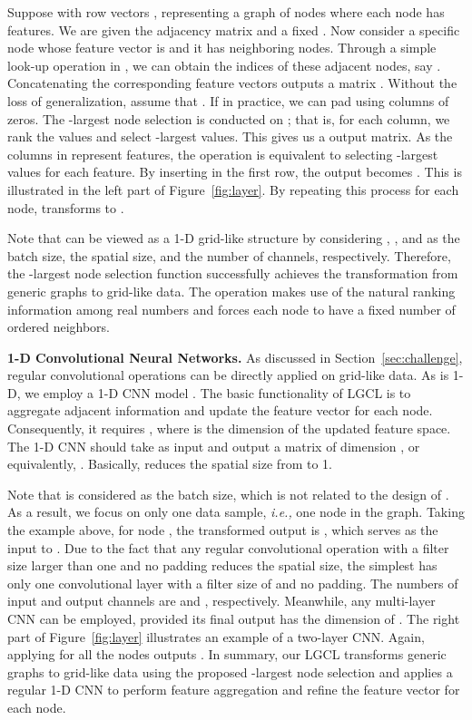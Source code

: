 \documentclass[sigconf]{acmart}
\begin{document}
Suppose  with row vectors , representing a graph of  nodes where each
node has  features. We are given the adjacency matrix  and a fixed . Now consider a specific
node  whose feature vector is  and it has  neighboring
nodes. Through a simple look-up operation in , we can obtain the
indices of these adjacent nodes, say .
Concatenating the corresponding feature vectors  outputs a matrix . Without the loss of generalization, assume
that . If  in practice, we can pad  using
columns of zeros. The -largest node selection is conducted on
; that is, for each column, we rank the  values and select
-largest values. This gives us a  output matrix. As
the columns in  represent features, the operation is
equivalent to selecting -largest values for each feature. By
inserting  in the first row, the output becomes . This is illustrated in the left
part of Figure~\ref{fig:layer}. By repeating this process for each
node,  transforms  to .


Note that  can be viewed as a 1-D grid-like structure by
considering , , and  as the batch size, the spatial
size, and the number of channels, respectively. Therefore, the
-largest node selection function  successfully achieves
the transformation from generic graphs to grid-like data. The
operation makes use of the natural ranking information among real
numbers and forces each node to have a fixed number of ordered
neighbors.


\textbf{1-D Convolutional Neural Networks.} As discussed in
Section~\ref{sec:challenge}, regular convolutional operations can be
directly applied on grid-like data. As  is 1-D, we employ a 1-D CNN model
. The basic functionality of LGCL is to aggregate adjacent
information and update the feature vector for each node.
Consequently, it requires ,
where  is the dimension of the updated feature space. The 1-D CNN
 should take  as input and output a matrix of dimension ,
or equivalently, . Basically, 
reduces the spatial size from  to 1.


Note that  is considered as the batch size, which is not related
to the design of . As a result, we focus on only one data
sample, \emph{i.e.,} one node in the graph. Taking the example
above, for node , the transformed output is , which serves as the input to
. Due to the fact that any regular convolutional operation
with a filter size larger than one and no padding reduces the
spatial size, the simplest  has only one convolutional
layer with a filter size of  and no padding. The numbers of
input and output channels are  and , respectively. Meanwhile,
any multi-layer CNN can be employed, provided its final output has
the dimension of . The right part of
Figure~\ref{fig:layer} illustrates an example of a two-layer CNN.
Again, applying  for all the  nodes outputs . In summary, our LGCL transforms
generic graphs to grid-like data using the proposed -largest node
selection and applies a regular 1-D CNN to perform feature
aggregation and refine the feature vector for each node.
\end{document}
